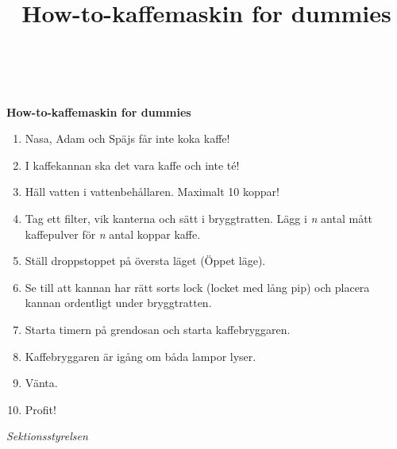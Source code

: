 \documentclass{dtek}
\title{How-to-kaffemaskin for dummies}
\begin{document}
\  \\
\makeheadfoot
\ \\

{\Huge \bf How-to-kaffemaskin for dummies} \\[1cm]

{\LARGE \begin{enumerate}

\item Nasa, Adam och Späjs får inte koka kaffe!
\item I kaffekannan ska det vara kaffe och inte té!
\item Häll vatten i vattenbehållaren. Maximalt 10 koppar!
\item Tag ett filter, vik kanterna och sätt i bryggtratten. Lägg i \textit{n} antal mått kaffepulver för \textit{n} antal koppar kaffe.
\item Ställ droppstoppet på översta läget (Öppet läge).
\item Se till att kannan har rätt sorts lock (locket med lång pip) och placera kannan ordentligt under bryggtratten.
\item Starta timern på grendosan och starta kaffebryggaren.
\item Kaffebryggaren är igång om båda lampor lyser.
\item Vänta.
\item Profit!
\end{enumerate}}

\vspace{1cm}

{\LARGE \itshape{Sektionsstyrelsen}}
\end{document}
